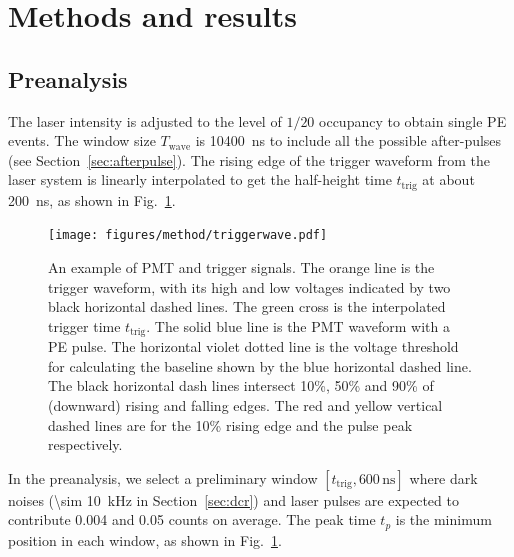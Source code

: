 \section{Methods and results}
\label{Method}
\subsection{Preanalysis}
\label{sec:laserstage}

The laser intensity is adjusted to the level of $1/20$ occupancy to obtain single PE events. The window size $T_{\mathrm{wave}}$ is \SI{10400}{ns} to include all the possible after-pulses (see Section~\ref{sec:afterpulse}). The rising edge of the trigger waveform from the laser system is linearly interpolated to get the half-height time $t_{\mathrm{trig}}$ at about \SI{200}{ns}, as shown in Fig.~\ref{fig:triggertime}.
\begin{figure}[!htbp]
    \centering
    \texttt{[image: figures/method/triggerwave.pdf]}
    \caption{An example of PMT and trigger signals. The orange line is the trigger waveform, with its high and low voltages indicated by two black horizontal dashed lines. The green cross is the interpolated trigger time $t_{\mathrm{trig}}$. The solid blue line is the PMT waveform with a PE pulse. The horizontal violet dotted line is the voltage threshold for calculating the baseline shown by the blue horizontal dashed line. The black horizontal dash lines intersect 10\%, 50\% and 90\% of (downward) rising and falling edges. The red and yellow vertical dashed lines are for the 10\% rising edge and the pulse peak respectively.}
    \label{fig:triggertime}
\end{figure}


In the preanalysis, we select a preliminary window $[t_{\mathrm{trig}},600\,\mathrm{ns}]$ where dark noises (\SI{\sim 10}{kHz} in Section~\ref{sec:dcr}) and laser pulses are expected to contribute 0.004 and 0.05 counts on average. The peak time $t_p$ is the minimum position in each window, as shown in Fig.~\ref{fig:triggertime}.



